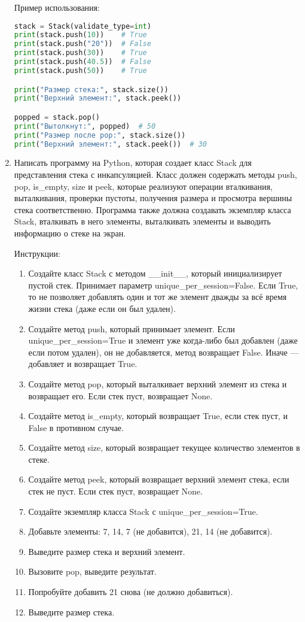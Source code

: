 \begin{enumerate}
Пример использования:
\begin{lstlisting}[language=Python]
stack = Stack(validate_type=int)
print(stack.push(10))    # True
print(stack.push("20"))  # False
print(stack.push(30))    # True
print(stack.push(40.5))  # False
print(stack.push(50))    # True

print("Размер стека:", stack.size())
print("Верхний элемент:", stack.peek())

popped = stack.pop()
print("Вытолкнут:", popped)  # 50
print("Размер после pop:", stack.size())
print("Верхний элемент:", stack.peek())  # 30
\end{lstlisting}

\item Написать программу на Python, которая создает класс Stack для представления стека с инкапсуляцией. Класс должен содержать методы push, pop, is\_empty, size и peek, которые реализуют операции вталкивания, выталкивания, проверки пустоты, получения размера и просмотра вершины стека соответственно. Программа также должна создавать экземпляр класса Stack, вталкивать в него элементы, выталкивать элементы и выводить информацию о стеке на экран.

Инструкции:
\begin{enumerate}
    \item Создайте класс Stack с методом \_\_init\_\_, который инициализирует пустой стек. Принимает параметр unique\_per\_session=False. Если True, то не позволяет добавлять один и тот же элемент дважды за всё время жизни стека (даже если он был удален).
    \item Создайте метод push, который принимает элемент. Если unique\_per\_session=True и элемент уже когда-либо был добавлен (даже если потом удален), он не добавляется, метод возвращает False. Иначе — добавляет и возвращает True.
    \item Создайте метод pop, который выталкивает верхний элемент из стека и возвращает его. Если стек пуст, возвращает None.
    \item Создайте метод is\_empty, который возвращает True, если стек пуст, и False в противном случае.
    \item Создайте метод size, который возвращает текущее количество элементов в стеке.
    \item Создайте метод peek, который возвращает верхний элемент стека, если стек не пуст. Если стек пуст, возвращает None.
    \item Создайте экземпляр класса Stack с unique\_per\_session=True.
    \item Добавьте элементы: 7, 14, 7 (не добавится), 21, 14 (не добавится).
    \item Выведите размер стека и верхний элемент.
    \item Вызовите pop, выведите результат.
    \item Попробуйте добавить 21 снова (не должно добавиться).
    \item Выведите размер стека.
\end{enumerate}


\end{enumerate}
